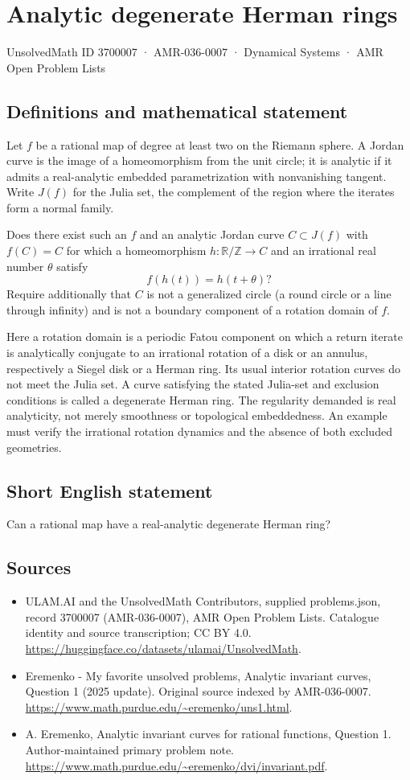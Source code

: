 \documentclass[11pt,a4paper]{article}
\begin{document}
\section*{Analytic degenerate Herman rings}\label{3700007}
{\small UnsolvedMath ID 3700007 · AMR-036-0007 · Dynamical Systems · AMR Open Problem Lists}
\subsection{Definitions and mathematical statement}
Let $f$ be a rational map of degree at least two on the
Riemann sphere. A Jordan curve is the image of a homeomorphism
from the unit circle; it is analytic if it admits a real-analytic
embedded parametrization with nonvanishing tangent.
Write $J(f)$ for the Julia set, the complement of the region
where the iterates form a normal family.

Does there exist such an $f$ and an analytic Jordan curve
$C\subset J(f)$ with $f(C)=C$ for which a homeomorphism
$h:\mathbb R/\mathbb Z\to C$ and an irrational real number
$\theta$ satisfy
\[
                   f(h(t))=h(t+\theta)?
\]
Require additionally that $C$ is not a generalized circle
(a round circle or a line through infinity) and is not a
boundary component of a rotation domain of $f$.

Here a rotation domain is a periodic Fatou component on
which a return iterate is analytically conjugate to an
irrational rotation of a disk or an annulus, respectively a
Siegel disk or a Herman ring. Its usual interior rotation
curves do not meet the Julia set. A curve satisfying the
stated Julia-set and exclusion conditions is called a
degenerate Herman ring.
The regularity demanded is real analyticity, not merely
smoothness or topological embeddedness. An example must
verify the irrational rotation dynamics and the absence of
both excluded geometries.
\subsection{Short English statement}
Can a rational map have a real-analytic degenerate Herman ring?
\subsection{Sources}
\begin{itemize}
\item[S1] ULAM.AI and the UnsolvedMath Contributors, supplied problems.json, record 3700007 (AMR-036-0007), AMR Open Problem Lists. Catalogue identity and source transcription; CC BY 4.0.
\url{https://huggingface.co/datasets/ulamai/UnsolvedMath}.
\item[S2] Eremenko - My favorite unsolved problems, Analytic invariant curves, Question 1 (2025 update). Original source indexed by AMR-036-0007.
\url{https://www.math.purdue.edu/~eremenko/uns1.html}.
\item[S3] A. Eremenko, Analytic invariant curves for rational functions, Question 1. Author-maintained primary problem note.
\url{https://www.math.purdue.edu/~eremenko/dvi/invariant.pdf}.
\end{itemize}
\end{document}
